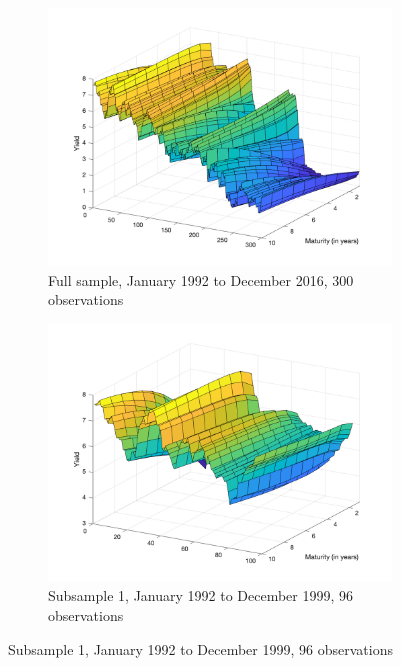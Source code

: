 \begin{figure}
     \centering
     \begin{subfigure}[b]{0.45\textwidth}
         \centering
         \includegraphics[width=\textwidth]{figures/fullsample}
         \caption{Full sample, January 1992 to December 2016, 300 observations}
         \label{fig:fullsample}
     \end{subfigure}
     \begin{subfigure}[b]{0.45\textwidth}
         \centering
         \includegraphics[width=\textwidth]{figures/sample1}
         \caption{Subsample 1, January 1992 to December 1999, 96 observations}
         \label{fig:subsample1}
     \end{subfigure}

\end{figure}
